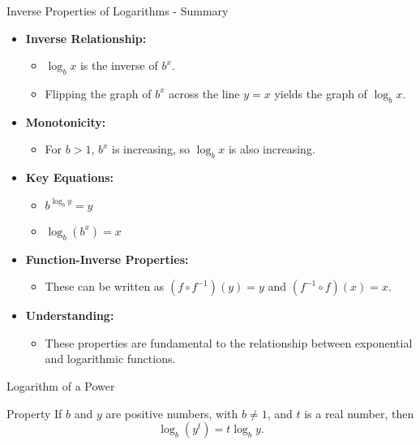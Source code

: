   \begin{frame}{Inverse Properties of Logarithms - Summary}
    \begin{itemize}
      \item \textbf{Inverse Relationship:}
        \begin{itemize}
          \item \(\log_b x\) is the inverse of \(b^x\).
          \item Flipping the graph of \(b^x\) across the line \(y=x\) yields the graph of \(\log_b x\).
        \end{itemize}
      \item \textbf{Monotonicity:}
        \begin{itemize}
          \item For \(b>1\), \(b^x\) is increasing, so \(\log_b x\) is also increasing.
        \end{itemize}
      \item \textbf{Key Equations:}
        \begin{itemize}
          \item \(b^{\log_b y} = y\)
          \item \(\log_b (b^x) = x\)
        \end{itemize}
      \item \textbf{Function-Inverse Properties:}
        \begin{itemize}
          \item These can be written as \((f \circ f^{-1})(y) = y\) and \((f^{-1} \circ f)(x) = x\).
        \end{itemize}
      \item \textbf{Understanding:}
        \begin{itemize}
          \item These properties are fundamental to the relationship between exponential and logarithmic functions.
        \end{itemize}
    \end{itemize}
  \end{frame}

  \begin{frame}{Logarithm of a Power}
    \begin{block}{Property}
      If \(b\) and \(y\) are positive numbers, with \(b \neq 1\), and \(t\) is a real number, then
      \[
        \log_b\left(y^t\right) = t \log_b y.
      \]
    \end{block}
  \end{frame}